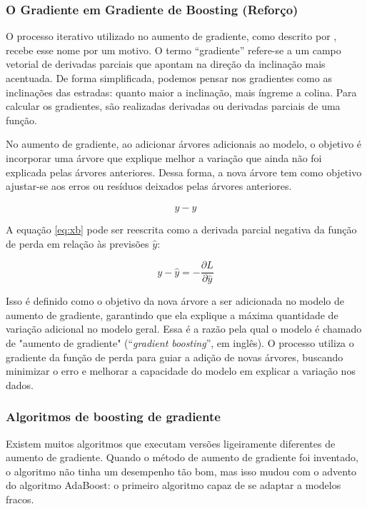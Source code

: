 \subsubsection{O Gradiente em Gradiente de Boosting (Refor\c co)} \label{subsubsec:boosting}

O processo iterativo utilizado no aumento de gradiente, como descrito por , recebe esse nome por um motivo. O termo ``gradiente'' refere-se a um campo vetorial de derivadas parciais que apontam na direção da inclinação mais acentuada. De forma simplificada, podemos pensar nos gradientes como as inclinações das estradas: quanto maior a inclinação, mais íngreme a colina. Para calcular os gradientes, são realizadas derivadas ou derivadas parciais de uma função.

No aumento de gradiente, ao adicionar árvores adicionais ao modelo, o objetivo é incorporar uma árvore que explique melhor a variação que ainda não foi explicada pelas árvores anteriores. Dessa forma, a nova árvore tem como objetivo ajustar-se aos erros ou resíduos deixados pelas árvores anteriores.

\begin{equation}
	y-\hat{y} \label{eq:xb}
\end{equation}

A equação \eqref{eq:xb} pode ser reescrita como a derivada parcial negativa da função de perda em relação às previsões $\hat{y}$:

\begin{equation}
	y-\hat{y} = -\frac{\partial L}{\partial \hat{y}} \label{eq:xb2}
\end{equation}

Isso é definido como o objetivo da nova árvore a ser adicionada no modelo de aumento de gradiente, garantindo que ela explique a máxima quantidade de variação adicional no modelo geral. Essa é a razão pela qual o modelo é chamado de "aumento de gradiente" (``\textit{gradient boosting}'', em inglês). O processo utiliza o gradiente da função de perda para guiar a adição de novas árvores, buscando minimizar o erro e melhorar a capacidade do modelo em explicar a variação nos dados.

\subsubsection{Algoritmos de boosting de gradiente}

Existem muitos algoritmos que executam versões ligeiramente diferentes de aumento de gradiente. Quando o método de aumento de gradiente foi inventado, o algoritmo não tinha um desempenho tão bom, mas isso mudou com o advento do algoritmo AdaBoost: o primeiro algoritmo capaz de se adaptar a modelos fracos.

